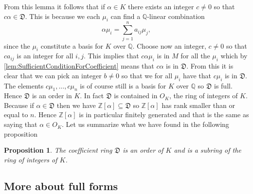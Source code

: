 \documentclass{article}
\newtheorem{proposition}{Proposition}[section]
\newcommand{\mfrak}[1]{\mathfrak{#1}}
\newcommand{\mcal}[1]{\mathcal{#1}}
\newcommand{\mbb}[1]{\mathbb{#1}}
\numberwithin{equation}{section}
\begin{document}
From this lemma it follows that if $\alpha \in K$ there exists an integer $c \neq 0$ so that $c \alpha \in \mfrak D$. This is because we each $\mu_i$ can find a $\mbb Q$-linear combination
$$\alpha \mu_i = \sum_{j=1}^n a_{ij} \mu_j,$$
since the $\mu_i$ constitute a basis for $K$ over $\mbb Q$. Choose now an integer, $c \neq 0$ so that $c a_{ij}$ is an integer for all $i,j$. This implies that $c \alpha \mu_i$ is in $M$ for all the $\mu_i$ which by \cref{lem:SufficientConditionForCoefficient} means that $c \alpha$ is in $\mfrak D$. From this it is clear that we can pick an integer $b \neq 0$ so that we for all $\mu_i$ have that $c \mu_i$ is in $\mfrak D$. The elements $c \mu_1, ..., c\mu_n$ is of course still is a basis for $K$ over $\mbb Q$ so $\mfrak D$ is full. Hence $\mfrak D$ is an order in $K$. In fact $\mfrak D$ is contained in $O_K$, the ring of integers of $K$. Because if $\alpha \in \mfrak D$ then we have $\mbb Z[\alpha] \subseteq \mfrak D$ so $\mbb Z[\alpha]$ has rank smaller than or equal to $n$. Hence $\mbb Z[\alpha]$ is in particular finitely generated and that is the same as saying that $\alpha \in O_K$. Let us summarize what we have found in the following proposition
\begin{proposition}\label{prop: Coefficient ring properties}
    The coefficient ring $\mfrak D$ is an order of $K$ and is a subring of the ring of integers of $K$.
\end{proposition}

\subsection{More about full forms}

\end{document}
